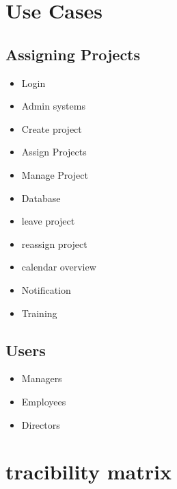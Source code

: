 \documentclass{article}
\begin{document}
  \section{Use Cases}
  \begin{paragraph}
	\subsection{Assigning Projects}
		\begin{itemize}
			\item Login 
			\item Admin systems
			\item Create project
			\item Assign Projects
			\item Manage Project 
			\item Database
			\item leave project
			\item reassign project
			\item calendar overview
			\item Notification
			\item Training
		\end{itemize}
		
	\subsection{Users}
		\begin{itemize}
			\item Managers
			\item Employees
			\item Directors
		\end{itemize}
  \end{paragraph}
  
  \section{tracibility matrix}
  \begin{paragraph}
  
  \end{paragraph}
  
\end{document}
